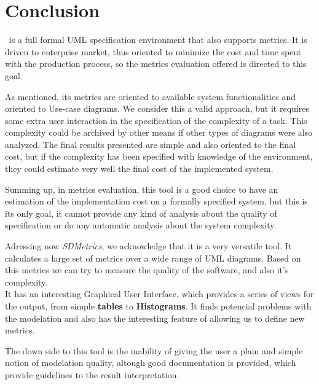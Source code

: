 \section{Conclusion} \label{conc}
\entArch\ is a full formal UML specification environment that also supports metrics. 
It is driven to enterprise market, thus oriented to minimize the cost and time spent with the production process, so the metrics evaluation offered is directed to this goal.

As mentioned, its metrics are oriented to available system functionalities and oriented to Use-case diagrams. 
We consider this a valid approach, but it requires some extra user interaction in the specification of the complexity of a task.
This complexity could be archived by other means if other types of diagrams were also analyzed.
The final results presented are simple and also oriented to the final cost, but if the complexity has been specified with knowledge of the environment, they could estimate very well the final cost of the implemented system.

Summing up, in metrics evaluation, this tool is a good choice to have an estimation of the implementation cost on a formally specified system, but this is its only goal, it cannot provide any kind of analysis about the quality of specification or do any automatic analysis about the system complexity.

Adressing now \textit{SDMetrics}, we acknowledge that it is a very versatile tool. It calculates a large set of metrics over a wide range of UML diagrams. Based on this metrics we can try to measure the quality of the software, and also it's complexity.\\
It has an interesting Graphical User Interface, which provides a series of views for the output, from simple \textbf{tables} to \textbf{Histograms}. It finds potencial problems with the modelation and also has the interesting feature of allowing us to define new metrics.

The down side to this tool is the inability of giving the user a plain and simple notion of modelation quality, altough good documentation is provided,  which provide guidelines to the result interpretation.
 

